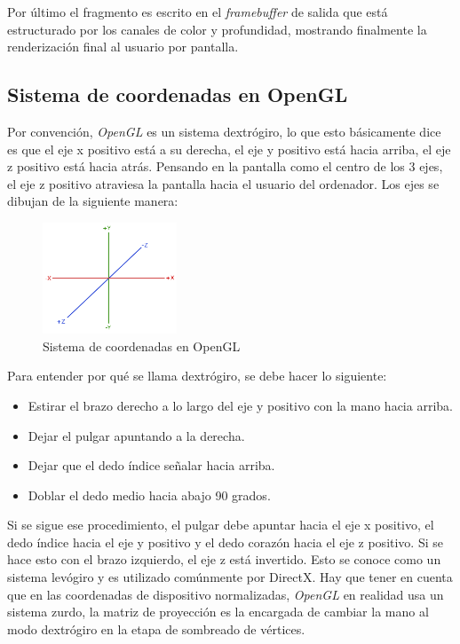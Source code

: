 \documentclass[a4paper]{book}
\begin{document}
Por último el fragmento es escrito en el \textit{framebuffer} de salida que está estructurado por los canales de color y profundidad, mostrando
finalmente la renderización final al usuario por pantalla. \cite{article:_opengl_arch} \cite{article:_opengl_bottlenecks} \cite{book:_opengl} \cite{book:rendering}

\subsection{Sistema de coordenadas en OpenGL}
\label{subsec:SysOpenGL}

Por convención, \textit{OpenGL} es un sistema dextrógiro, lo que esto básicamente dice es que el eje x positivo está a su derecha, el eje y
positivo está hacia arriba, el eje z positivo está hacia atrás. Pensando en la pantalla como el centro de los 3 ejes, el eje z positivo
atraviesa la pantalla hacia el usuario del ordenador. Los ejes se dibujan de la siguiente manera:

\begin{figure}[H]
    \centering
    \includegraphics[width=4cm, keepaspectratio]{img/coordinate_systems_right_handed.png}
    \caption{Sistema de coordenadas en OpenGL}
    \label{coordinate_systems_right_handed}
\end{figure}

Para entender por qué se llama dextrógiro, se debe hacer lo siguiente:

\begin{itemize}
  \item Estirar el brazo derecho a lo largo del eje y positivo con la mano hacia arriba.
  \item Dejar el pulgar apuntando a la derecha.
  \item Dejar que el dedo índice señalar hacia arriba.
  \item Doblar el dedo medio hacia abajo 90 grados.
\end{itemize}

Si se sigue ese procedimiento, el pulgar debe apuntar hacia el eje x positivo, el dedo índice hacia
el eje y positivo y el dedo corazón hacia el eje z positivo. Si se hace esto con el brazo izquierdo,
el eje z está invertido. Esto se conoce como un sistema levógiro y es utilizado comúnmente por DirectX.
Hay que tener en cuenta que en las coordenadas de dispositivo normalizadas, \textit{OpenGL} en realidad usa un
sistema zurdo, la matriz de proyección es la encargada de cambiar la mano al modo dextrógiro en la etapa de
sombreado de vértices. \cite{opengl:_learn_opengl}
\end{document}
